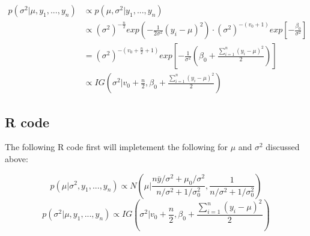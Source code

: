 \documentclass[
]{book}
\begin{document}
\[\begin{aligned} p(\sigma^2| \mu, y_1,...,y_n) &\propto p(\mu,\sigma^2 | y_1,...,y_n)\\ &\propto  (\sigma^2)^{-\frac{n}{2}} exp(-\frac{1}{2\sigma^2}(y_i-\mu)^2) \cdot (\sigma^2)^{-(v_0+1)}exp[-\frac{\beta_0}{\sigma^2}]\\ &= (\sigma^2)^{-(v_0+\frac{n}{2}+1)}exp[-\frac{1}{\sigma^2}(\beta_0+\frac{\sum_{i=1}^n(y_i-\mu)^2}{2})] \\ &\propto IG(\sigma^2|v_0+\frac{n}{2},\beta_0+\frac{\sum_{i=1}^n(y_i-\mu)^2}{2})\end{aligned}\]

\hypertarget{r-code-1}{%
\subsection{R code}\label{r-code-1}}

The following R code first will impletement the following for \(\mu\) and \(\sigma^2\) discussed above:

\[p(\mu| \sigma^2, y_1,...,y_n) \propto  N(\mu |\frac{n\bar{y}/\sigma^2+\mu_0/\sigma^2}{n/\sigma^2+1/\sigma_0^2},\frac{1}{n/\sigma^2+1/\sigma_0^2}) \]
\[ p(\sigma^2| \mu, y_1,...,y_n)  \propto IG(\sigma^2|v_0+\frac{n}{2},\beta_0+\frac{\sum_{i=1}^n(y_i-\mu)^2}{2})\]
\end{document}
